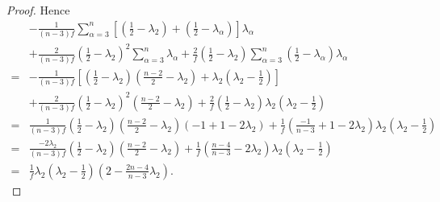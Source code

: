 \documentclass[10pt,a4paper]{amsart}
\begin{document}
\begin{proof}
Hence
\begin{equation*}
	\begin{aligned}
		&-{\frac{1}{(n-3)f}}\sum_{\alpha=3}^n\left[ ({\frac{1}{2}}-\lambda_{2})+({\frac{1}{2}}-\lambda_{\alpha})\right] \lambda_\alpha\\	 &+\frac{2}{(n-3)f}(\frac{1}{2}-\lambda_{2})^2\sum_{\alpha=3}^n\lambda_{\alpha}+\frac{2}{f}({\frac{1}{2}}-\lambda_{2})\sum_{\alpha=3}^n({\frac{1}{2}}-\lambda_{\alpha})\lambda_{\alpha}\\
		 =&-\frac{1}{(n-3)f}\left[(\frac{1}{2}-\lambda_2)(\frac{n-2}{2}-\lambda_2)+\lambda_2(\lambda_2-\frac{1}{2})\right] \\
		  &+\frac{2}{(n-3)f}\left(\frac{1}{2}-\lambda_2\right)^2(\frac{n-2}{2}-\lambda_2)+\frac{2}{f}(\frac{1}{2}-\lambda_2)\lambda_2(\lambda_2-\frac{1}{2})\\
		 =&\frac{1}{(n-3)f}(\frac{1}{2}-\lambda_2)(\frac{n-2}{2}-\lambda_2)(-1+1-2\lambda_2)+\frac{1}{f}(\frac{-1}{n-3}+1-2\lambda_2)\lambda_2(\lambda_2-\frac{1}{2})\\
		 =&\frac{-2\lambda_2}{(n-3)f}(\frac{1}{2}-\lambda_2)(\frac{n-2}{2}-\lambda_2)+\frac{1}{f}(\frac{n-4}{n-3}-2\lambda_2)\lambda_2(\lambda_2-\frac{1}{2})\\
=&\frac{1}{f}\lambda_2(\lambda_2-\frac{1}{2})(2-\frac{2n-4}{n-3}\lambda_2).
	\end{aligned}
\end{equation*}



\end{proof}
\end{document}
